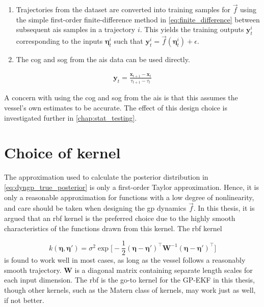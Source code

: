 \begin{enumerate}
    \item Trajectories from the dataset are converted into training samples for $\vec{f}$ using the simple first-order finite-difference method in \cref{eq:finite_difference} between subsequent \acrshort{ais} samples in a trajectory $i$. This yields the training outputs $\boldsymbol{y}_t^{i}$ corresponding to the inputs $\boldsymbol{\eta}_t^i$ such that $\boldsymbol{y}_t^i = \vec{f}(\boldsymbol{\eta}_t^i) + \epsilon$.
    \item The \acrshort{cog} and \acrshort{sog} from the \acrshort{ais} data can be used directly.
\end{enumerate}

\begin{align}\label{eq:finite_difference}
    \boldsymbol{y}_t = \frac{\boldsymbol{x}_{t+1} - \boldsymbol{x}_t}{\tau_{t+1} - \tau_t}
\end{align}

A concern with using the \acrshort{cog} and \acrshort{sog} from the \acrshort{ais} is that this assumes the vessel's own estimates to be accurate. The effect of this design choice is investigated further in \cref{chap:stat_testing}.


\section{Choice of kernel}
The approximation used to calculate the posterior distribution in \cref{eq:dyngp_true_posterior} is only a first-order Taylor approximation. Hence, it is only a reasonable approximation for functions with a low degree of nonlinearity, and care should be taken when designing the \acrshort{gp} dynamics $\vec{f}$. In this thesis, it is argued that an \acrshort{rbf} kernel is the preferred choice due to the highly smooth characteristics of the functions drawn from this kernel. The \acrshort{rbf} kernel

\begin{equation}\label{eq:dyngp_kernel}
    k(\boldsymbol{\eta}, \boldsymbol{\eta}') = \sigma^2 \exp \big[ - \frac{1}{2} (\boldsymbol{\eta} - \boldsymbol{\eta}')^\intercal \boldsymbol{W}^{-1} (\boldsymbol{\eta} - \boldsymbol{\eta}')^\intercal\big]
\end{equation}
is found to work well in most cases, as long as the vessel follows a reasonably smooth trajectory. $\boldsymbol{W}$ is a diagonal matrix containing separate length scales for each input dimension. The \acrshort{rbf} is the go-to kernel for the GP-EKF in this thesis, though other kernels, such as the Matern class of kernels, may work just as well, if not better.

